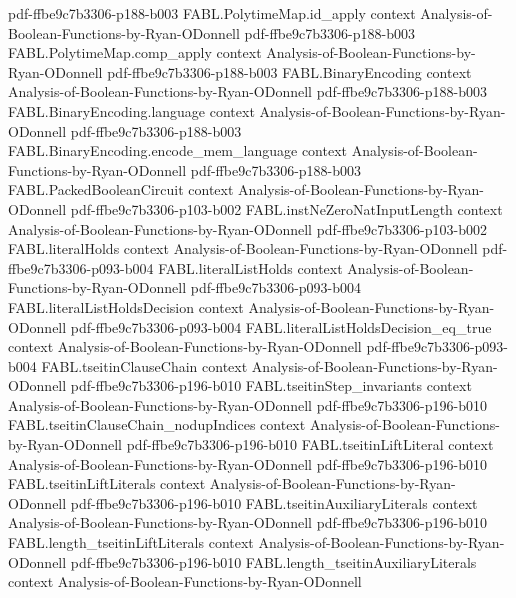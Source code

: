 \begin{theorem}
  {pdf-ffbe9c7b3306-p188-b003}
\proofstep
  {FABL.PolytimeMap.id_apply}
  {context}
  {Analysis-of-Boolean-Functions-by-Ryan-ODonnell}
  {pdf-ffbe9c7b3306-p188-b003}
\proofstep
  {FABL.PolytimeMap.comp_apply}
  {context}
  {Analysis-of-Boolean-Functions-by-Ryan-ODonnell}
  {pdf-ffbe9c7b3306-p188-b003}
\proofstep
  {FABL.BinaryEncoding}
  {context}
  {Analysis-of-Boolean-Functions-by-Ryan-ODonnell}
  {pdf-ffbe9c7b3306-p188-b003}
\proofstep
  {FABL.BinaryEncoding.language}
  {context}
  {Analysis-of-Boolean-Functions-by-Ryan-ODonnell}
  {pdf-ffbe9c7b3306-p188-b003}
\proofstep
  {FABL.BinaryEncoding.encode_mem_language}
  {context}
  {Analysis-of-Boolean-Functions-by-Ryan-ODonnell}
  {pdf-ffbe9c7b3306-p188-b003}
\proofstep
  {FABL.PackedBooleanCircuit}
  {context}
  {Analysis-of-Boolean-Functions-by-Ryan-ODonnell}
  {pdf-ffbe9c7b3306-p103-b002}
\proofstep
  {FABL.instNeZeroNatInputLength}
  {context}
  {Analysis-of-Boolean-Functions-by-Ryan-ODonnell}
  {pdf-ffbe9c7b3306-p103-b002}
\proofstep
  {FABL.literalHolds}
  {context}
  {Analysis-of-Boolean-Functions-by-Ryan-ODonnell}
  {pdf-ffbe9c7b3306-p093-b004}
\proofstep
  {FABL.literalListHolds}
  {context}
  {Analysis-of-Boolean-Functions-by-Ryan-ODonnell}
  {pdf-ffbe9c7b3306-p093-b004}
\proofstep
  {FABL.literalListHoldsDecision}
  {context}
  {Analysis-of-Boolean-Functions-by-Ryan-ODonnell}
  {pdf-ffbe9c7b3306-p093-b004}
\proofstep
  {FABL.literalListHoldsDecision_eq_true}
  {context}
  {Analysis-of-Boolean-Functions-by-Ryan-ODonnell}
  {pdf-ffbe9c7b3306-p093-b004}
\proofstep
  {FABL.tseitinClauseChain}
  {context}
  {Analysis-of-Boolean-Functions-by-Ryan-ODonnell}
  {pdf-ffbe9c7b3306-p196-b010}
\proofstep
  {FABL.tseitinStep_invariants}
  {context}
  {Analysis-of-Boolean-Functions-by-Ryan-ODonnell}
  {pdf-ffbe9c7b3306-p196-b010}
\proofstep
  {FABL.tseitinClauseChain_nodupIndices}
  {context}
  {Analysis-of-Boolean-Functions-by-Ryan-ODonnell}
  {pdf-ffbe9c7b3306-p196-b010}
\proofstep
  {FABL.tseitinLiftLiteral}
  {context}
  {Analysis-of-Boolean-Functions-by-Ryan-ODonnell}
  {pdf-ffbe9c7b3306-p196-b010}
\proofstep
  {FABL.tseitinLiftLiterals}
  {context}
  {Analysis-of-Boolean-Functions-by-Ryan-ODonnell}
  {pdf-ffbe9c7b3306-p196-b010}
\proofstep
  {FABL.tseitinAuxiliaryLiterals}
  {context}
  {Analysis-of-Boolean-Functions-by-Ryan-ODonnell}
  {pdf-ffbe9c7b3306-p196-b010}
\proofstep
  {FABL.length_tseitinLiftLiterals}
  {context}
  {Analysis-of-Boolean-Functions-by-Ryan-ODonnell}
  {pdf-ffbe9c7b3306-p196-b010}
\proofstep
  {FABL.length_tseitinAuxiliaryLiterals}
  {context}
  {Analysis-of-Boolean-Functions-by-Ryan-ODonnell}

\end{theorem}
